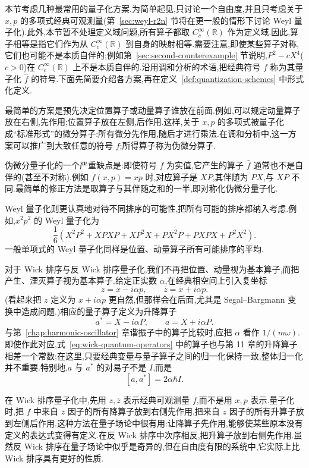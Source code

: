本节考虑几种最常用的量子化方案.为简单起见,只讨论一个自由度,并且只考虑关于 $x,p$ 的多项式经典可观测量(第~\ref{sec:weyl-r2n} 节将在更一般的情形下讨论 Weyl 量子化).此外,本节暂不处理定义域问题,所有算子都取 $C_c^\infty(\mathbb R)$ 作为定义域.因此,算子相等是指它们作为从 $C_c^\infty(\mathbb R)$ 到自身的映射相等.需要注意,即使某些算子对称,它们也可能不是本质自伴的;例如第~\ref{sec:second-counterexample} 节说明,$P^2-cX^4$($c>0$)在 $C_c^\infty(\mathbb R)$ 上不是本质自伴的.沿用调和分析的术语,把经典符号 $f$ 称为其量子化 $\widehat f$ 的符号.下面先简要介绍各方案,再在定义~\ref{def:quantization-schemes} 中形式化定义.

最简单的方案是预先决定位置算子或动量算子谁放在前面.例如,可以规定动量算子放在右侧,先作用;位置算子放在左侧,后作用.这样,关于 $x,p$ 的多项式被量子化成“标准形式”的微分算子:所有微分先作用,随后才进行乘法.在调和分析中,这一方案可以推广到大致任意的符号 $f$;所得算子称为伪微分算子.

伪微分量子化的一个严重缺点是:即使符号 $f$ 为实值,它产生的算子 $\widehat f$ 通常也不是自伴的(甚至不对称).例如 $f(x,p)=xp$ 时,对应算子是 $XP$,其伴随为 $PX$,与 $XP$ 不同.最简单的修正方法是取算子与其伴随之和的一半,即对称化伪微分量子化.

Weyl 量子化则更认真地对待不同排序的可能性,把所有可能的排序都纳入考虑.例如,$x^2p^2$ 的 Weyl 量子化为
\[
\frac16\left(X^2P^2+XPXP+XP^2X+PX^2P+PXPX+P^2X^2\right).
\]
一般单项式的 Weyl 量子化同样是位置、动量算子所有可能排序的平均.

对于 Wick 排序与反 Wick 排序量子化,我们不再把位置、动量视为基本算子,而把产生、湮灭算子视为基本算子.给定正实数 $\alpha$,在经典相空间上引入复坐标
\[
z=x-i\alpha p,
\qquad
\bar z=x+i\alpha p.
\label{eq:wick-classical-coordinates}
\]
(看起来把 $z$ 定义为 $x+i\alpha p$ 更自然,但那样会在后面,尤其是 Segal--Bargmann 变换中造成问题.)相应的量子算子定义为升降算子
\[
a^*=X-i\alpha P,
\qquad
a=X+i\alpha P.
\label{eq:wick-quantum-operators}
\]
与第~\ref{chap:harmonic-oscillator} 章谐振子中的算子比较时,应把 $\alpha$ 看作 $1/(m\omega)$.即使作此对应,式~\eqref{eq:wick-quantum-operators} 中的算子也与第 11 章的升降算子相差一个常数;在这里,只要经典变量与量子算子之间的归一化保持一致,整体归一化并不重要.特别地,$a$ 与 $a^*$ 的对易子不是 $I$,而是
\[
[a,a^*]=2\alpha\hbar I.
\]

在 Wick 排序量子化中,先用 $z,\bar z$ 表示经典可观测量 $f$,而不是用 $x,p$ 表示.量子化时,把 $f$ 中来自 $\bar z$ 因子的所有降算子放到右侧先作用,把来自 $z$ 因子的所有升算子放到左侧后作用.这种方法在量子场论中很有用:让降算子先作用,能够使某些原本没有定义的表达式变得有定义.在反 Wick 排序中次序相反,把升算子放到右侧先作用.虽然反 Wick 排序在量子场论中似乎是奇异的,但在自由度有限的系统中,它实际上比 Wick 排序具有更好的性质.

